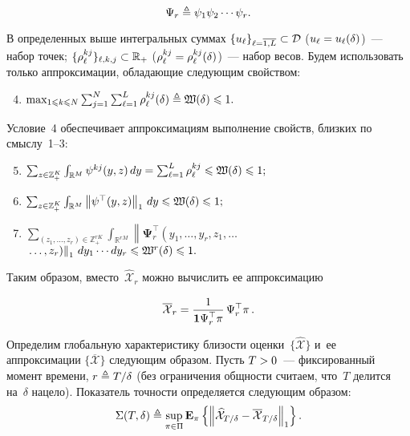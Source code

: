 \begin{multicols}{2}
\begin{itemize}
\noindent
$$
\Psi_r \triangleq \psi_1\psi_2 \cdots \psi_r.
$$
\end{itemize}

В определенных выше интегральных суммах $\{u_{\ell}\}_{\ell=\overline{1,L}} 
\hm\subset \mathcal{D}$ ($u_{\ell}\hm=u_{\ell}(\delta)$)~--- набор точек; 
$\{\rho_{\ell}^{kj}\}_{\ell,k,j} \hm\subset \mathbb{R}_+$
($\rho_{\ell}^{kj} \hm=\rho_{\ell}^{kj}(\delta)$)~--- набор весов. Будем использовать только аппроксимации, обла\-да\-ющие сле\-ду\-ющим 
свойством:
\begin{enumerate}[(1)]
\setcounter{enumi}{3}
\item
$ %
\max_{1 \leqslant k \leqslant N} \sum\nolimits_{j=1}^N \sum\nolimits_{\ell=1}^L 
\rho_{\ell}^{kj}(\delta) \hm\ebd \mathfrak{W}(\delta)\hm \leqslant 1.$
\end{enumerate}
Условие~4 обеспечивает аппроксимациям выполнение свойств, близ\-ких по смыс\-лу~1--3:
\begin{enumerate}[(1)]
\setcounter{enumi}{4}
\item
$ \sum\nolimits_{z \in \mathbb{Z}_+^K} \int\nolimits_{\mathbb{R}^M} \psi^{kj}(y,z)\, dy\hm = 
\sum\nolimits_{\ell=1}^L \rho_{\ell}^{kj} \leqslant \mathfrak{W}(\delta) \hm\leqslant 1;$
\item
$ \sum\nolimits_{z \in \mathbb{Z}_+^K} \int\nolimits_{\mathbb{R}^M} \left\|\psi^{\top}(y,z)\right\|_1 \,dy \leqslant \mathfrak{W}(\delta) \hm\leqslant 1;$
\item
$\sum\nolimits_{(z_1,\ldots, z_r) \in \mathbb{Z}_+^{rK}} \int\nolimits_{\mathbb{R}^{rM}}
\left\|\mathbf{\Psi}_r^{\top}\left(y_1,\ldots, y_r,z_1,\ldots\right.\right.$\linebreak
$\left.\left.\ldots , z_r\right)\right\|_1\, dy_1\cdots dy_r 
\hm\leqslant \mathfrak{W}^r(\delta) \hm\leqslant 1.$
\end{enumerate}
Таким образом, вместо~$\widehat{\mathcal{X}}_r$ мож\-но вы\-чис\-лить ее  
аппроксимацию

\noindent
\begin{equation*}
\overline{\mathcal{X}}_r = \displaystyle\frac{\displaystyle 1\mathstrut}{\displaystyle \mathbf{1}\Psi_r^{\top}  \pi\mathstrut}\,\Psi_r^{\top} \pi\,.
\end{equation*}

Определим глобальную характеристику бли\-зости оценки~$\{\widehat{\mathcal{X}}\}$  
и~ее аппроксимации $\{\overline{\mathcal{X}}\}$ сле\-ду\-ющим образом. Пусть  $T \hm> 0$~---  фиксированный момент времени,   
$r \hm\ebd {T}/{\delta}$ (без 
ограничения общ\-ности считаем, что~$T$ делится на~$\delta$ нацело). Показатель 
точ\-ности опре\-де\-ля\-ет\-ся сле\-ду\-ющим образом:
 \begin{equation*}
\Sigma(T,\delta) \triangleq \sup\limits_{\pi \in \Pi}\mathbf{E}_{ \pi }\left\{ \mathop{\left\|\widehat{\mathcal{X}}_{{T}/{\delta}} - 
\overline{\mathcal{X}}_{{T}/{\delta}}\right\|_{1}} \right\}.
 \end{equation*}


\end{multicols}
